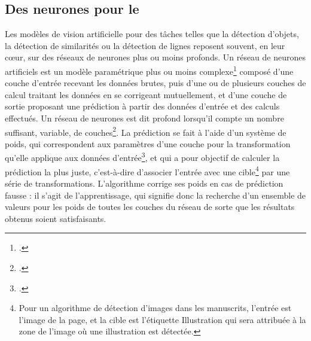 
	\subsection{Des \og neurones \fg pour le \dl}
	Les modèles de vision artificielle pour des tâches telles que la détection d'objets, la détection de similarités ou la détection de lignes reposent souvent, en leur cœur, sur des réseaux de neurones plus ou moins profonds. Un réseau de neurones artificiels est un modèle paramétrique plus ou moins complexe\footcite{azencottIntroductionAuMachine2018} composé d'une couche d'entrée recevant les données brutes, puis d'une ou de plusieurs couches de calcul traitant les données en se corrigeant mutuellement, et d'une couche de sortie proposant une prédiction à partir des données d'entrée et des calculs effectués. Un réseau de neurones est dit \og profond \fg lorsqu'il compte un nombre suffisant, variable, de couches\footcite{azencottIntroductionAuMachine2018}. La prédiction se fait à l'aide d'un système de poids, qui correspondent aux paramètres d'une couche pour la transformation qu'elle applique aux données d'entrée\footcite{cholletApprentissageProfondAvec2020a}, et qui a pour objectif de calculer la prédiction la plus juste, c'est-à-dire d'associer l'entrée avec une cible\footnote{Pour un algorithme de détection d'images dans les manuscrits, l'entrée est l'image de la page, et la cible est l'étiquette \og Illustration \fg qui sera attribuée à la zone de l'image où une illustration est détectée.} par une série de transformations. L'algorithme corrige ses poids en cas de prédiction fausse : il s'agit de l'apprentissage, qui signifie donc la recherche d'un ensemble de valeurs pour les poids de toutes les couches du réseau de sorte que les résultats obtenus soient satisfaisants.
    
